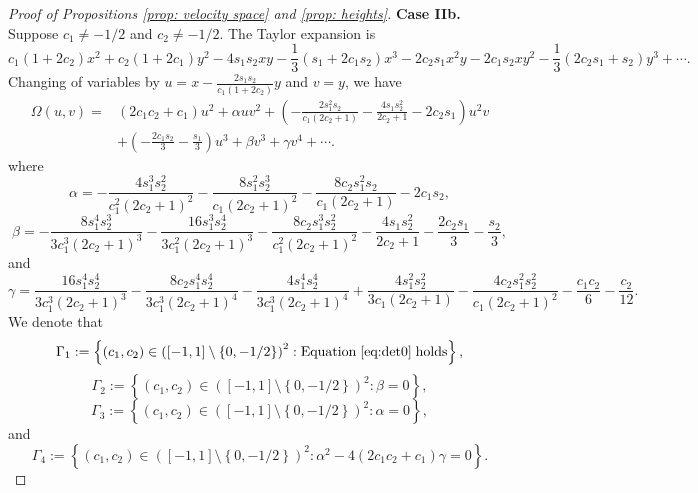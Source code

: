 \documentclass[12pt]{amsart}
\begin{document}
\begin{proof}[Proof of Propositions \ref{prop: velocity space} and \ref{prop: heights}]
		{\bf Case IIb.} Suppose $c_1\neq-1/2$ and $c_2\neq-1/2$. The Taylor expansion is 
  $$c_1(1 + 2c_2) x^2 + c_2(1 + 2c_1 ) y^2 - 4s_1 s_2 x y - \frac{1}{3}(s_1 + 2c_1 s_2) x^3 - 2c_2 s_1 x^2 y - 2c_1 s_2 x y^2 - \frac{1}{3}(2c_2 s_1 + s_2) y^3+\cdots.$$
   Changing of variables by $u=x-\frac{2s_1s_2}{c_1(1+2c_2)}y$ and $v=y$, we have
  \begin{align*}
      \Omega\left(u,v\right)=&\left(2c_1c_2+c_1\right)u^2+\alpha uv^2
      +\left(-\frac{2s_1^2s_2}{c_1(2c_2+1)}-\frac{4s_1s_2^2}{2c_2+1}-2c_2s_1 \right)u^2v\\
      &+\left(-\frac{2c_1s_2}{3}- \frac{s_1}{3}\right)u^3+\beta v^3+\gamma v^4 +\cdots.
  \end{align*}
  where \begin{equation}\label{coe:uv2}
      \alpha=-\frac{4s_1^3s_2^2}{c_1^2(2c_2+1)^2}-\frac{8s_1^2s_2^3}{c_1(2c_2+1)^2}-\frac{8c_2s_1^2s_2}{c_1(2c_2+1)}-2c_1s_2,
  \end{equation}
\begin{equation}\label{coe:v3}
   \beta=-\frac{8s_1^4s_2^3}{3c_1^3(2c_2+1)^3}-\frac{16s_1^3s_2^4}{3c_1^2(2c_2+1)^3}-\frac{8c_2s_1^3s_2^2}{c_1^2(2c_2+1)^2}-\frac{4s_1s_2^2}{2c_2+1} -\frac{2c_2s_1}{3}-\frac{s_2}{3},
\end{equation}
and \begin{equation}\label{coe:v4}
   \gamma= \frac{16 s_1^4 s_2^4}{3 c_1^3 (2 c_2+1)^3}-\frac{8 c_2 s_1^4 s_2^4}{3 c_1^3 (2 c_2+1)^4}-\frac{4 s_1^4 s_2^4}{3 c_1^3 (2 c_2+1)^4}+\frac{4 s_1^2 s_2^2}{3 c_1 (2 c_2+1)}-\frac{4 c_2 s_1^2 s_2^2}{c_1 (2 c_2+1)^2}-\frac{c_1 c_2}{6} - \frac{c_2}{12}.
\end{equation}
We  denote that 
  \begin{equation*}
      \Gamma_1:=\left\{\left(c_1,c_2\right)\in\left(\left[-1,1\right]\setminus\left\{0,-1/2\right\}\right)^{2}:\mathrm{Equation}\;\eqref{eq:det0}\;\mathrm{holds}\right\},
  \end{equation*}
  \begin{equation*}
      \Gamma_2:=\left\{\left(c_1,c_2\right)\in\left(\left[-1,1\right]\setminus\left\{0,-1/2\right\}\right)^{2}:\beta=0\right\},
  \end{equation*}
    \begin{equation*}
      \Gamma_3:=\left\{\left(c_1,c_2\right)\in\left(\left[-1,1\right]\setminus\left\{0,-1/2\right\}\right)^{2}:\alpha=0\right\},
  \end{equation*}
  and
      \begin{equation*}
      \Gamma_4:=\left\{\left(c_1,c_2\right)\in\left(\left[-1,1\right]\setminus\left\{0,-1/2\right\}\right)^{2}:\alpha^2-4(2c_1c_2+c_1)\gamma=0\right\}.
  \end{equation*}
  

\end{proof}
\end{document}
